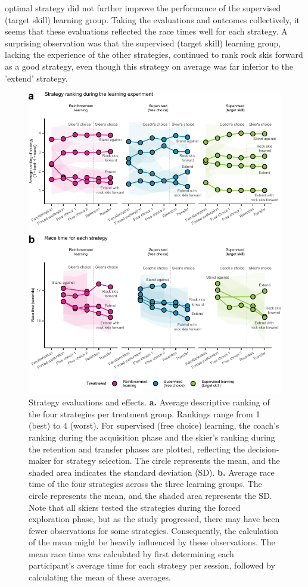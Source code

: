 \documentclass[pdflatex,sn-nature]{sn-jnl}%
\theoremstyle{thmstyleone}%
\theoremstyle{thmstyletwo}%
\theoremstyle{thmstylethree}%
\begin{document}
optimal strategy did not further improve the performance of the supervised (target skill) learning group. Taking the evaluations and outcomes collectively, it seems that these evaluations reflected the race times well for each strategy. A surprising observation was that the supervised (target skill) learning group, lacking the experience of the other strategies, continued to rank rock skis forward as a good strategy, even though this strategy on average was far inferior to the 'extend' strategy.


\begin{figure}[H]
\centering
\includegraphics[]{figures/figure_ranking_average_3.pdf}
\caption{Strategy evaluations and effects. \textbf{a. }Average descriptive ranking of the four strategies per treatment group. Rankings range from 1 (best) to 4 (worst). For supervised (free choice) learning, the coach's ranking during the acquisition phase and the skier's ranking during the retention and transfer phases are plotted, reflecting the decision- maker for strategy selection. The circle represents the mean, and the shaded area indicates the standard deviation (SD). \textbf{b.} Average race time of the four strategies across the three learning groups. The circle represents the mean, and the shaded area represents the SD. Note that all skiers tested the strategies during the forced exploration phase, but as the study progressed, there may have been fewer observations for some strategies. Consequently, the calculation of the mean might be heavily influenced by these observations. The mean race time was calculated by first determining each participant's average time for each strategy per session, followed by calculating the mean of these averages.}\label{fig: rank}
\end{figure}
\end{document}
